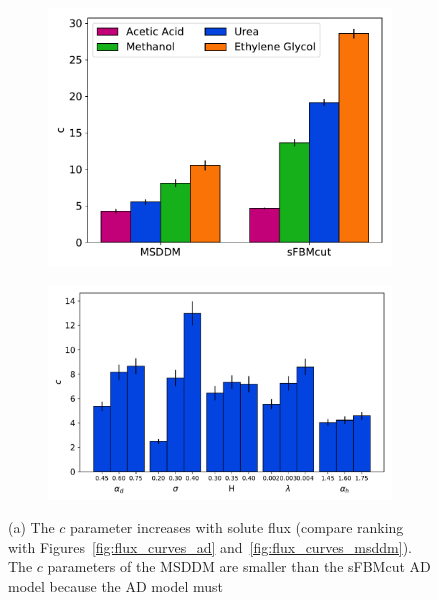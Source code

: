 \documentclass[12pt]{article}
\begin{document}
  \begin{figure}
  \centering
  \begin{subfigure}{0.42\textwidth}
  \includegraphics[width=\textwidth]{c_parameter_comparison.pdf}
  \caption{}\label{fig:c_parameters}
  \end{subfigure}
  \begin{subfigure}{0.53\textwidth}
  \vspace{0.5em}
  \includegraphics[width=\textwidth]{c_influence.pdf}
  \caption{}\label{fig:c_influence}
  \end{subfigure}
  \caption{(a) The $c$ parameter increases with solute flux (compare ranking with
  Figures~\ref{fig:flux_curves_ad} and~\ref{fig:flux_curves_msddm}). The $c$ parameters
  of the MSDDM are smaller than the sFBMcut AD model because the AD model must
}
\end{figure}
\end{document}
